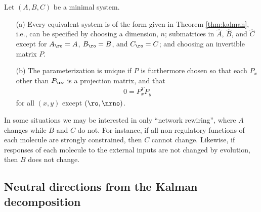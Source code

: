 \begin{theorem}
    Let $(A,B,C)$ be a minimal system.
    \begin{itemize}
        \item[(a)]
            Every equivalent system is of the form given in Theorem \ref{thm:kalman},
            i.e., can be specified by choosing a dimension, $n$;
            submatrices in $\widehat A$, $\widehat B$, and $\widehat C$ 
            except for $A_\ro=A$, $B_\ro=B$, and $C_\ro=C$;
            and choosing an invertible matrix $P$.

        \item[(b)]
            The parameterization is unique
            if $P$ is furthermore chosen so that 
            each $P_x$ other than $P_\ro$ is a projection matrix,
            and that 
            \begin{align*}
                0
                =
                P_x^T P_y
            \end{align*}
            for all $(x,y)$ except $(\ro,\nrno)$.

    \end{itemize} 
\end{theorem}


In some situations we may be interested in only ``network rewiring'',
where $A$ changes while $B$ and $C$ do not.
For instance, 
if all non-regulatory functions of each molecule are strongly constrained,
then $C$ cannot change.
Likewise, if responses of each molecule to the external inputs are not changed by evolution,
then $B$ does not change.


\subsection{Neutral directions from the Kalman decomposition}

